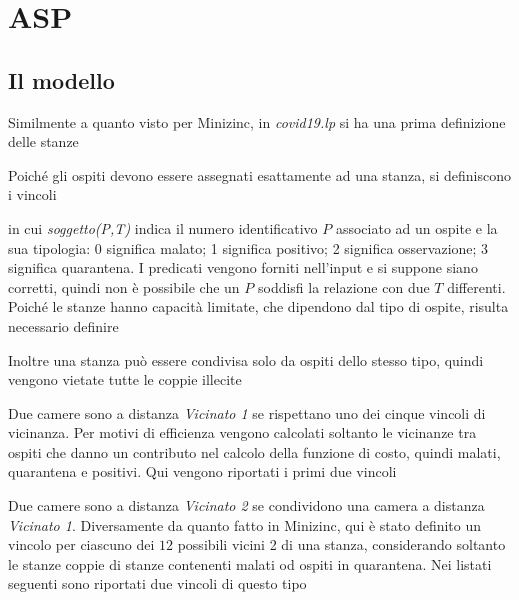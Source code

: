 
\section{ASP}
\subsection{Il modello}

Similmente a quanto visto per Minizinc, in \emph{covid19.lp} si ha una prima definizione delle stanze


\noindent
Poiché gli ospiti devono essere assegnati esattamente ad una stanza, si definiscono i vincoli

in cui \emph{soggetto(P,T)} indica il numero identificativo $P$ associato ad un ospite e la sua tipologia:
0 significa malato;
1 significa positivo;
2 significa osservazione;
3 significa quarantena.
I predicati vengono forniti nell'input e si suppone siano corretti, quindi non è possibile che un $P$ soddisfi la relazione con due $T$ differenti.
\\
\noindent
Poiché le stanze hanno capacità limitate, che dipendono dal tipo di ospite, risulta necessario definire


\noindent
Inoltre una stanza può essere condivisa solo da ospiti dello stesso tipo,
quindi vengono vietate tutte le coppie illecite


\noindent
Due camere sono a distanza \emph{Vicinato 1} se rispettano uno dei cinque vincoli di vicinanza.
Per motivi di efficienza vengono calcolati soltanto le vicinanze tra ospiti che danno un contributo nel calcolo della funzione di costo, quindi malati, quarantena e positivi.
Qui vengono riportati i primi due vincoli


\noindent
Due camere sono a distanza \emph{Vicinato 2} se condividono una camera a distanza \emph{Vicinato 1}.
Diversamente da quanto fatto in Minizinc, qui è stato definito un vincolo per ciascuno dei $12$ possibili vicini 2 di una stanza, considerando soltanto le stanze coppie di stanze contenenti malati od ospiti in quarantena.
Nei listati seguenti sono riportati due vincoli di questo tipo



